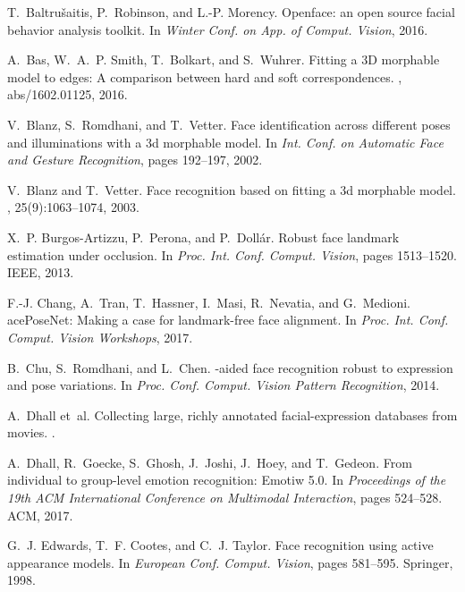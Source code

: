 \documentclass[a4paper, 10pt, conference]{ieeeconf}
\begin{document}
{\begin{thebibliography}{10}
T.~Baltru{\v{s}}aitis, P.~Robinson, and L.-P. Morency.
\newblock Openface: an open source facial behavior analysis toolkit.
\newblock In {\em Winter Conf. on App. of Comput. Vision}, 2016.

A.~Bas, W.~A.~P. Smith, T.~Bolkart, and S.~Wuhrer.
\newblock Fitting a {3D} morphable model to edges: {A} comparison between hard
  and soft correspondences.
, abs/1602.01125, 2016.

V.~Blanz, S.~Romdhani, and T.~Vetter.
\newblock Face identification across different poses and illuminations with a
  3d morphable model.
\newblock In {\em Int. Conf. on Automatic Face and Gesture Recognition}, pages
  192--197, 2002.

V.~Blanz and T.~Vetter.
\newblock Face recognition based on fitting a 3d morphable model.
, 25(9):1063--1074, 2003.

X.~P. Burgos-Artizzu, P.~Perona, and P.~Doll{\'a}r.
\newblock Robust face landmark estimation under occlusion.
\newblock In {\em Proc. Int. Conf. Comput. Vision}, pages 1513--1520. IEEE,
  2013.

F.-J. Chang, A.~Tran, T.~Hassner, I.~Masi, R.~Nevatia, and G.~Medioni.
ace{P}ose{N}et: Making a case for landmark-free face alignment.
\newblock In {\em Proc. Int. Conf. Comput. Vision Workshops}, 2017.

B.~Chu, S.~Romdhani, and L.~Chen.
-aided face recognition robust to expression and pose variations.
\newblock In {\em Proc. Conf. Comput. Vision Pattern Recognition}, 2014.

A.~Dhall et~al.
\newblock Collecting large, richly annotated facial-expression databases from
  movies.
.

A.~Dhall, R.~Goecke, S.~Ghosh, J.~Joshi, J.~Hoey, and T.~Gedeon.
\newblock From individual to group-level emotion recognition: Emotiw 5.0.
\newblock In {\em Proceedings of the 19th ACM International Conference on
  Multimodal Interaction}, pages 524--528. ACM, 2017.

G.~J. Edwards, T.~F. Cootes, and C.~J. Taylor.
\newblock Face recognition using active appearance models.
\newblock In {\em European Conf. Comput. Vision}, pages 581--595. Springer,
  1998.


\end{thebibliography}}
\end{document}
